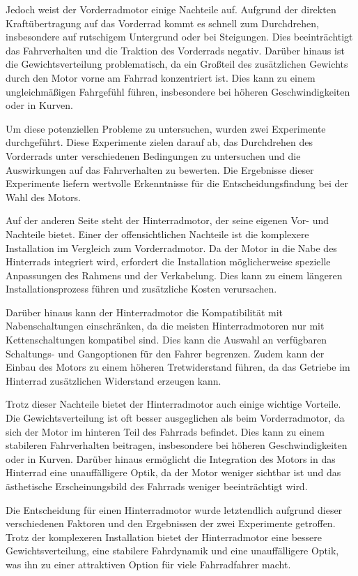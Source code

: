 Jedoch weist der Vorderradmotor einige Nachteile auf. Aufgrund der direkten Kraftübertragung auf das Vorderrad kommt es schnell zum Durchdrehen, insbesondere auf rutschigem Untergrund oder bei Steigungen. Dies beeinträchtigt das Fahrverhalten und die Traktion des Vorderrads negativ. Darüber hinaus ist die Gewichtsverteilung problematisch, da ein Großteil des zusätzlichen Gewichts durch den Motor vorne am Fahrrad konzentriert ist. Dies kann zu einem ungleichmäßigen Fahrgefühl führen, insbesondere bei höheren Geschwindigkeiten oder in Kurven.

Um diese potenziellen Probleme zu untersuchen, wurden zwei Experimente durchgeführt. Diese Experimente zielen darauf ab, das Durchdrehen des Vorderrads unter verschiedenen Bedingungen zu untersuchen und die Auswirkungen auf das Fahrverhalten zu bewerten. Die Ergebnisse dieser Experimente liefern wertvolle Erkenntnisse für die Entscheidungsfindung bei der Wahl des Motors.

Auf der anderen Seite steht der Hinterradmotor, der seine eigenen Vor- und Nachteile bietet. Einer der offensichtlichen Nachteile ist die komplexere Installation im Vergleich zum Vorderradmotor. Da der Motor in die Nabe des Hinterrads integriert wird, erfordert die Installation möglicherweise spezielle Anpassungen des Rahmens und der Verkabelung. Dies kann zu einem längeren Installationsprozess führen und zusätzliche Kosten verursachen.

Darüber hinaus kann der Hinterradmotor die Kompatibilität mit Nabenschaltungen einschränken, da die meisten Hinterradmotoren nur mit Kettenschaltungen kompatibel sind. Dies kann die Auswahl an verfügbaren Schaltungs- und Gangoptionen für den Fahrer begrenzen. Zudem kann der Einbau des Motors zu einem höheren Tretwiderstand führen, da das Getriebe im Hinterrad zusätzlichen Widerstand erzeugen kann.

Trotz dieser Nachteile bietet der Hinterradmotor auch einige wichtige Vorteile. Die Gewichtsverteilung ist oft besser ausgeglichen als beim Vorderradmotor, da sich der Motor im hinteren Teil des Fahrrads befindet. Dies kann zu einem stabileren Fahrverhalten beitragen, insbesondere bei höheren Geschwindigkeiten oder in Kurven. Darüber hinaus ermöglicht die Integration des Motors in das Hinterrad eine unauffälligere Optik, da der Motor weniger sichtbar ist und das ästhetische Erscheinungsbild des Fahrrads weniger beeinträchtigt wird.

Die Entscheidung für einen Hinterradmotor wurde letztendlich aufgrund dieser verschiedenen Faktoren und den Ergebnissen der zwei Experimente getroffen. Trotz der komplexeren Installation bietet der Hinterradmotor eine bessere Gewichtsverteilung, eine stabilere Fahrdynamik und eine unauffälligere Optik, was ihn zu einer attraktiven Option für viele Fahrradfahrer macht.

